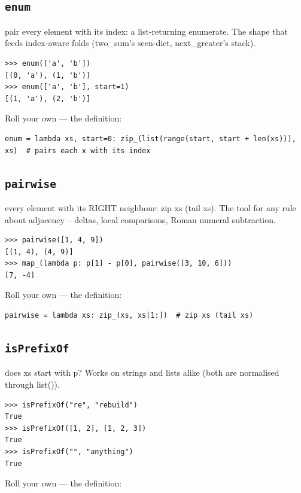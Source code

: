 \documentclass[10pt,letterpaper]{book}
\begin{document}
\subsection{\texttt{enum}}\label{def:enum}
pair every element with its index: a list-returning enumerate. The shape that feeds index-aware folds (two\_sum's seen-dict, next\_greater's stack).
\begin{lstlisting}[style=ex]
>>> enum(['a', 'b'])
[(0, 'a'), (1, 'b')]
>>> enum(['a', 'b'], start=1)
[(1, 'a'), (2, 'b')]
\end{lstlisting}

Roll your own --- the definition:

\begin{lstlisting}[style=ex]
enum = lambda xs, start=0: zip_(list(range(start, start + len(xs))), xs)  # pairs each x with its index
\end{lstlisting}
\subsection{\texttt{pairwise}}\label{def:pairwise}
every element with its RIGHT neighbour: zip xs (tail xs). The tool for any rule about adjacency -- deltas, local comparisons, Roman numeral subtraction.
\begin{lstlisting}[style=ex]
>>> pairwise([1, 4, 9])
[(1, 4), (4, 9)]
>>> map_(lambda p: p[1] - p[0], pairwise([3, 10, 6]))
[7, -4]
\end{lstlisting}

Roll your own --- the definition:

\begin{lstlisting}[style=ex]
pairwise = lambda xs: zip_(xs, xs[1:])  # zip xs (tail xs)
\end{lstlisting}

\subsection{\texttt{isPrefixOf}}\label{def:isPrefixOf}
does xs start with p? Works on strings and lists alike (both are normalised through list()).
\begin{lstlisting}[style=ex]
>>> isPrefixOf("re", "rebuild")
True
>>> isPrefixOf([1, 2], [1, 2, 3])
True
>>> isPrefixOf("", "anything")
True
\end{lstlisting}

Roll your own --- the definition:
\end{document}
